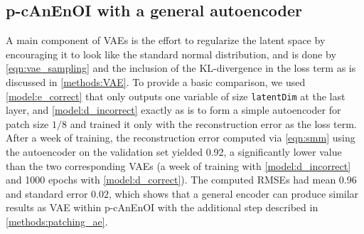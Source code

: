 \documentclass[final,3p]{elsarticle}
\theoremstyle{break}
\begin{document}
\subsection{p-cAnEnOI with a general autoencoder}\label{NR:ae}
A main component of VAEs is the effort to regularize the latent space by encouraging it to look like the standard normal distribution, and is done by \cref{eqn:vae_sampling} and the inclusion of the KL-divergence in the loss term as is discussed in \cref{methods:VAE}. 
To provide a basic comparison, we used \cref{model:e_correct} that only outputs one variable of size {\tt latentDim} at the last layer, and \cref{model:d_incorrect} exactly as is to form a simple autoencoder for patch size $1/8$ and trained it only with the reconstruction error as the loss term.
After a week of training, the reconstruction error computed via \cref{eqn:smm} using the autoencoder on the validation set yielded 0.92, a significantly lower value than the two corresponding VAEs (a week of training with \cref{model:d_incorrect} and 1000 epochs with \cref{model:d_correct}).
The computed RMSEs had mean $0.96$ and standard error $0.02$, which shows that a general encoder can produce similar results as VAE within p-cAnEnOI with the additional step described in \cref{methods:patching_ae}.
\end{document}
